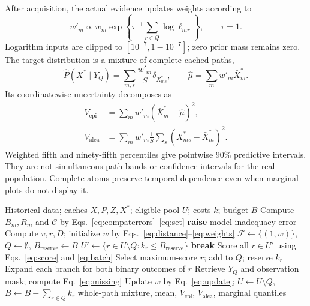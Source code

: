 After acquisition, the actual evidence updates weights according to
\begin{equation}
 w'_m\propto w_m\exp\left\{\tau^{-1}\sum_{r\in Q}\log\ell_{mr}\right\},\qquad\tau=1.
 \label{eq:update}
\end{equation}
Logarithm inputs are clipped to $[10^{-7},1-10^{-7}]$; zero prior mass remains zero. The target distribution is a mixture of complete cached paths,
\begin{equation}
 \widehat P(X^*\mid Y_Q)=\sum_{m,s}\frac{w'_m}{S}\delta_{X^*_{ms}},
 \qquad\widehat\mu=\sum_mw'_m\bar X^*_m.
 \label{eq:mixture}
\end{equation}
Its coordinatewise uncertainty decomposes as
\begin{align}
 V_{\mathrm{epi}}&=\sum_mw'_m(\bar X^*_m-\widehat\mu)^2,\nonumber\\
 V_{\mathrm{alea}}&=\sum_mw'_m\frac1S\sum_s(X^*_{ms}-\bar X^*_m)^2.
 \label{eq:uncertainty}
\end{align}
Weighted fifth and ninety-fifth percentiles give pointwise 90\% predictive intervals. They are not simultaneous path bands or confidence intervals for the real population. Complete atoms preserve temporal dependence even when marginal plots do not display it.

\begin{algorithm}[tbp]
\caption{Compatible-mechanism inference with cached process evidence}
\label{alg:main}
\small
\begin{algorithmic}[1]
\Require Historical data; caches $X,P,Z,X^*$; eligible pool $U$; costs $k$; budget $B$
\State Compute $B_m,R_m$ and $\mathcal C$ by Eqs.~\eqref{eq:compaterrors}--\eqref{eq:set}
 \State \textbf{raise} model-inadequacy error
\EndIf
\State Compute $v,r,D$; initialize $w$ by Eqs.~\eqref{eq:distance}--\eqref{eq:weights}
 \State $\mathcal F\gets\{(1,w)\}$, $Q\gets\emptyset$, $B_{\mathrm{reserve}}\gets B$
  \State $U'\gets\{r\in U\setminus Q:k_r\leq B_{\mathrm{reserve}}\}$
   \State \textbf{break} \EndIf
  \State Score all $r\in U'$ using Eqs.~\eqref{eq:score} and \eqref{eq:batch}
  \State Select maximum-score $r$; add to $Q$; reserve $k_r$
  \State Expand each branch for both binary outcomes of $r$
 \EndFor
 \State Retrieve $Y_Q$ and observation mask; compute Eq.~\eqref{eq:missing}
 \State Update $w$ by Eq.~\eqref{eq:update}; $U\gets U\setminus Q$, $B\gets B-\sum_{r\in Q}k_r$
\EndWhile
\State \Return whole-path mixture, mean, $V_{\mathrm{epi}}$, $V_{\mathrm{alea}}$, marginal quantiles
\end{algorithmic}
\end{algorithm}

